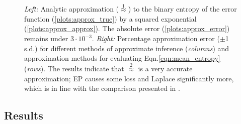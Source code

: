 \begin{figure}\centering
	\caption[Taylor series approximation to the value of information in GP classification]{\emph{Left:} Analytic approximation ({\scriptsize $\stackrel{1}{\approx}$}) to the binary entropy of the error function (\ref{plots:approx_true}) by a squared exponential (\ref{plots:approx_approx}). The absolute error (\ref{plots:approx_error}) remains under $3\cdot 10^{-3}$. \emph{Right:} Percentage approximation error ($\pm$1 s.d.) for different methods of approximate inference (\emph{columns}) and approximation methods for evaluating Eqn.\eqref{eqn:mean_entropy} (\emph{rows}). The results indicate that {\scriptsize $\stackrel{2}{\approx}$} is a very accurate approximation; EP causes some loss and Laplace significantly more, which is in line with the comparison presented in \citep{Kuss05}. }\label{fig:trick}
\end{figure}
	

\subsection{Results}

